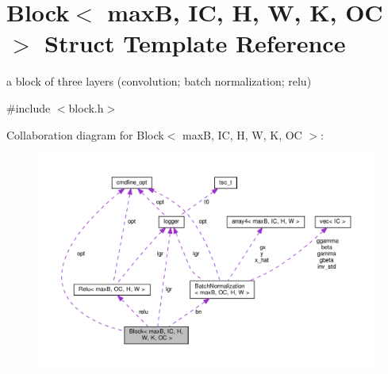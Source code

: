 \hypertarget{structBlock}{}\section{Block$<$ maxB, IC, H, W, K, OC $>$ Struct Template Reference}
\label{structBlock}


a block of three layers (convolution; batch normalization; relu)  




{\ttfamily \#include $<$block.\+h$>$}



Collaboration diagram for Block$<$ maxB, IC, H, W, K, OC $>$\+:\nopagebreak
\begin{figure}[H]
\begin{center}
\leavevmode
\includegraphics[width=350pt]{structBlock__coll__graph}
\end{center}
\end{figure}
